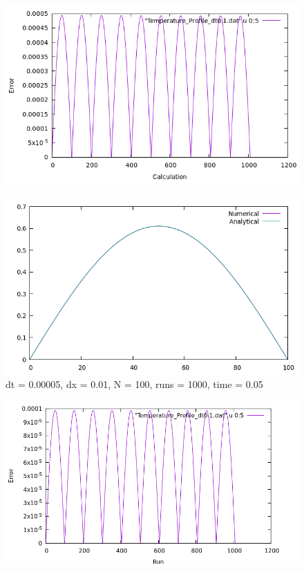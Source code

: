 \documentclass{beamer}
\begin{document}
	\begin{frame}
	\begin{figure}
	\centering
	\includegraphics[scale=0.5]{2.png}
\end{figure}
	\end{frame}
	
	\begin{frame}
	\begin{figure}
	\centering
	\includegraphics[scale=0.5]{3.png}
	\caption{dt = 0.00005, dx = 0.01, N = 100, runs = 1000, time = 0.05}
\end{figure}
	\end{frame}
	
	\begin{frame}
	\begin{figure}
	\centering
	\includegraphics[scale=0.4]{4.png}
\end{figure}
	\end{frame}
	
\end{document}

